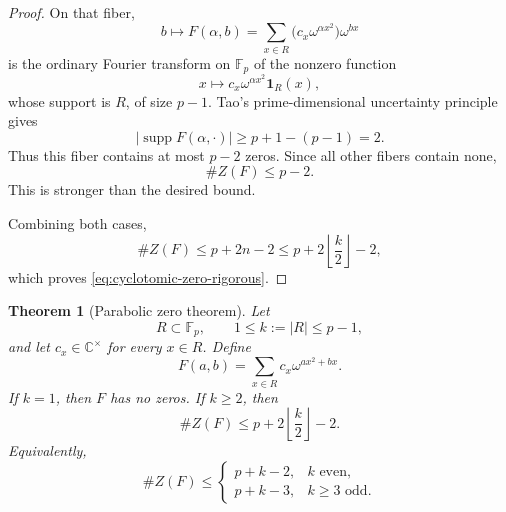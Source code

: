 \documentclass[11pt]{article}
\newtheorem{theorem}{Theorem}[section]
\newcommand{\F}{\mathbb F}
\newcommand{\C}{\mathbb C}
\newcommand{\supp}{\operatorname{supp}}
\begin{document}
\begin{proof}
On that fiber,
\[
 b\longmapsto F(\alpha,b)
 =
 \sum_{x\in R}
 \bigl(c_x\omega^{\alpha x^2}\bigr)\omega^{bx}
\]
is the ordinary Fourier transform on \(\F_p\) of the nonzero function
\[
 x\longmapsto c_x\omega^{\alpha x^2}\mathbf 1_R(x),
\]
whose support is \(R\), of size \(p-1\).  Tao's
prime-dimensional uncertainty principle \cite{Tao} gives
\[
 |\supp F(\alpha,\cdot)|
 \ge
 p+1-(p-1)=2.
\]
Thus this fiber contains at most \(p-2\) zeros.  Since all other fibers
contain none,
\[
 \#Z(F)\le p-2.
\]
This is stronger than the desired bound.

Combining both cases,
\[
 \#Z(F)\le p+2n-2
 \le
 p+2\left\lfloor\frac{k}{2}\right\rfloor-2,
\]
which proves \eqref{eq:cyclotomic-zero-rigorous}.
\end{proof}

\begin{theorem}[Parabolic zero theorem]
\label{thm:parabolic-zero-rigorous}
Let
\[
 R\subset\F_p,\qquad 1\le k:=|R|\le p-1,
\]
and let \(c_x\in\C^\times\) for every \(x\in R\).  Define
\[
 F(a,b)=\sum_{x\in R}c_x\omega^{a x^2+b x}.
\]
If \(k=1\), then \(F\) has no zeros.  If \(k\ge2\), then
\begin{equation}
 \boxed{
 \#Z(F)
 \le
 p+2\left\lfloor\frac{k}{2}\right\rfloor-2.
 }
 \label{eq:parabolic-zero-rigorous}
\end{equation}
Equivalently,
\[
 \#Z(F)\le
 \begin{cases}
 p+k-2,&k\text{ even},\\
 p+k-3,&k\ge3\text{ odd}.
 \end{cases}
\]
\end{theorem}
\end{document}
